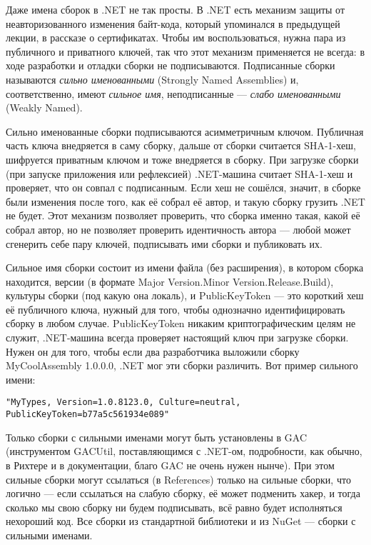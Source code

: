 \documentclass{../../text-style}
\begin{document}
Даже имена сборок в .NET не так просты. В .NET есть механизм защиты от неавторизованного изменения байт-кода, который упоминался в предыдущей лекции, в рассказе о сертификатах. Чтобы им воспользоваться, нужна пара из публичного и приватного ключей, так что этот механизм применяется не всегда: в ходе разработки и отладки сборки не подписываются. Подписанные сборки называются \textit{сильно именованными} (Strongly Named Assemblies) и, соответственно, имеют \textit{сильное имя}, неподписанные --- \textit{слабо именованными} (Weakly Named).

Сильно именованные сборки подписываются асимметричным ключом. Публичная часть ключа внедряется в саму сборку, дальше от сборки считается SHA-1-хеш, шифруется приватным ключом и тоже внедряется в сборку. При загрузке сборки (при запуске приложения или рефлексией) .NET-машина считает SHA-1-хеш и проверяет, что он совпал с подписанным. Если хеш не сошёлся, значит, в сборке были изменения после того, как её собрал её автор, и такую сборку грузить .NET не будет. Этот механизм позволяет проверить, что сборка именно такая, какой её собрал автор, но не позволяет проверить идентичность автора --- любой может сгенерить себе пару ключей, подписывать ими сборки и публиковать их.

Сильное имя сборки состоит из имени файла (без расширения), в котором сборка находится, версии (в формате Major Version.Minor Version.Release.Build), культуры сборки (под какую она локаль), и PublicKeyToken --- это короткий хеш её публичного ключа, нужный для того, чтобы однозначно идентифицировать сборку в любом случае. PublicKeyToken никаким криптографическим целям не служит, .NET-машина всегда проверяет настоящий ключ при загрузке сборки. Нужен он для того, чтобы если два разработчика выложили сборку MyCoolAssembly 1.0.0.0, .NET мог эти сборки различить. Вот пример сильного имени:

\begin{verbatim}
"MyTypes, Version=1.0.8123.0, Culture=neutral, PublicKeyToken=b77a5c561934e089"
\end{verbatim}

Только сборки с сильными именами могут быть установлены в GAC (инструментом GACUtil, поставляющимся с .NET-ом, подробности, как обычно, в Рихтере и в документации, благо GAC не очень нужен нынче). При этом сильные сборки могут ссылаться (в References) только на сильные сборки, что логично --- если ссылаться на слабую сборку, её может подменить хакер, и тогда сколько мы свою сборку ни будем подписывать, всё равно будет исполняться нехороший код. Все сборки из стандартной библиотеки и из NuGet --- сборки с сильными именами.
\end{document}
